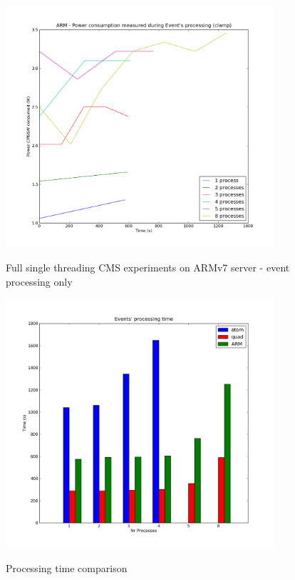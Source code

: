\begin{figure}[h!]
  \centering
    \includegraphics[width=100mm]{"img/aalto/aalto_armEvents"}
    \label{fig:nf_ss}
    \caption{Full single threading CMS experiments on ARMv7 server - event
processing only}
\end{figure}


\begin{figure}[h!]
  \centering
    \includegraphics[width=100mm]{"img/aalto/aalto_all_time"}
    \label{fig:nf_ss}
    \caption{Processing time comparison}
\end{figure}

